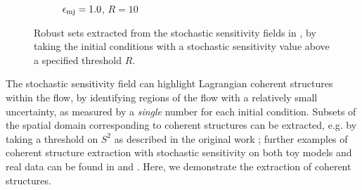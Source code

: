 \begin{figure}
\begin{center}
\begin{subfigure}{0.49\textwidth}
			\caption{\(\epsilon_{\mathrm{mj}} = 1.0\), \(R = 10\)}
		\end{subfigure}
		\caption{Robust sets extracted from the stochastic sensitivity fields in , by taking the initial conditions with a stochastic sensitivity value above a specified threshold \(R\). }
		\label{fig:ex_jet_robust}
	\end{center}
\end{figure}

The stochastic sensitivity field can highlight Lagrangian coherent structures within the flow, by identifying regions of the flow with a relatively small uncertainty, as measured by a \emph{single} number for each initial condition.
Subsets of the spatial domain corresponding to coherent structures can be extracted, e.g. by taking a threshold on \(S^2\) as described in the original work \citep{Balasuriya_2020_StochasticSensitivityComputable}; further examples of coherent structure extraction with stochastic sensitivity on both toy models and real data can be found in \citet{Balasuriya_2020_StochasticSensitivityComputable} and \citet{BadzaEtAl_2023_HowSensitiveAre}.
Here, we demonstrate the extraction of coherent structures.








